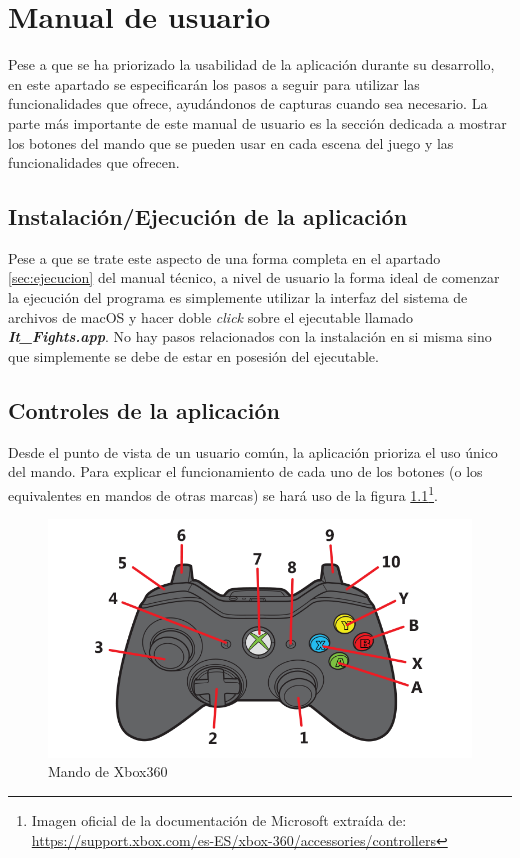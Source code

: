 \chapter{Manual de usuario}

Pese a que se ha priorizado la usabilidad de la aplicación durante su desarrollo, en este apartado se especificarán los pasos a seguir para utilizar las funcionalidades que ofrece, ayudándonos de capturas cuando sea necesario. La parte más importante de este manual de usuario es la sección dedicada a mostrar los botones del mando que se pueden usar en cada escena del juego y las funcionalidades que ofrecen.

\section{Instalación/Ejecución de la aplicación}

Pese a que se trate este aspecto de una forma completa en el apartado \ref{sec:ejecucion} del manual técnico, a nivel de usuario la forma ideal de comenzar la ejecución del programa es simplemente utilizar la interfaz del sistema de archivos de macOS y hacer doble \textit{click} sobre el ejecutable llamado \textbf{\textit{It\_Fights.app}}. No hay pasos relacionados con la instalación en si misma sino que simplemente se debe de estar en posesión del ejecutable.


\section{Controles de la aplicación}
\label{sec:controles}
Desde el punto de vista de un usuario común, la aplicación prioriza el uso único del mando. Para explicar el funcionamiento de cada uno de los botones (o los equivalentes en mandos de otras marcas) se hará uso de la figura \ref{controles:mando}\footnote{Imagen oficial de la documentación de Microsoft extraída de: \\ \url{https://support.xbox.com/es-ES/xbox-360/accessories/controllers}}.

\begin{figure}
	\centerline{\includegraphics[width=12cm]{otros/graphicalInterface/mando.png}}
	\caption{Mando de Xbox360}
	\label{controles:mando}
\end{figure}

